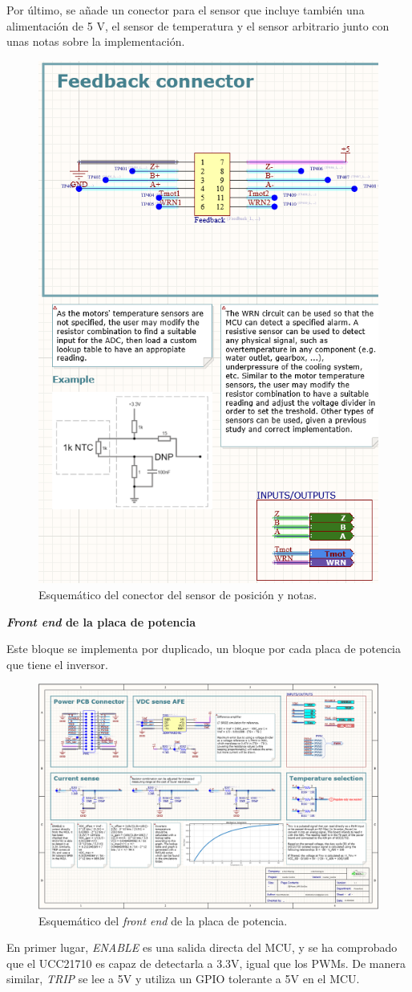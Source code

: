 Por último, se añade un conector para el sensor que incluye también una alimentación de 5 V, el sensor de temperatura y el sensor arbitrario junto con unas notas sobre la implementación.
\begin{figure}[H]
	\centering
	\includegraphics[width=0.5\linewidth]{fig/schFDBcontrol}
	\caption{Esquemático del conector del sensor de posición y notas.}
\end{figure}

\textbf{\textit{Front end} de la placa de potencia}

Este bloque se implementa por duplicado, un bloque por cada placa de potencia que tiene el inversor.

\begin{figure}[H]
	\centering
	\includegraphics[width=0.7\linewidth]{fig/schPOWERAFEcontrol}
	\caption{Esquemático del \textit{front end} de la placa de potencia.}
\end{figure}


En primer lugar, \textit{ENABLE} es una salida directa del MCU, y se ha comprobado que el UCC21710 es capaz de detectarla a 3.3V, igual que los PWMs. De manera similar, \textit{TRIP} se lee a 5V y utiliza un GPIO tolerante a 5V en el MCU.

